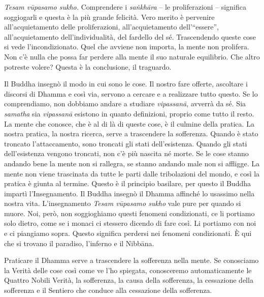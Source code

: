 \emph{Tesam vūpasamo sukho.} Comprendere i \emph{saṅkhāra} -- le
proliferazioni -- significa soggiogarli e questa è la più grande
felicità. Vero merito è pervenire all'acquietamento delle
proliferazioni, all'acquietamento dell'``essere'', all'acquietamento
dell'individualità, del fardello del sé. Trascendendo queste cose si
vede l'incondizionato. Quel che avviene non importa, la mente non
prolifera. Non c'è nulla che possa far perdere alla mente il suo
naturale equilibrio. Che altro potreste volere? Questa è la conclusione,
il traguardo.

Il Buddha insegnò il modo in cui sono le cose. Il nostro fare offerte,
ascoltare i discorsi di Dhamma e così via, servono a cercare e a
realizzare tutto questo. Se lo comprendiamo, non dobbiamo andare a
studiare \emph{vipassanā}, avverrà da sé. Sia \emph{samatha} sia
\emph{vipassanā} esistono in quanto definizioni, proprio come tutto il
resto. La mente che conosce, che è al di là di queste cose, è il culmine
della pratica. La nostra pratica, la nostra ricerca, serve a trascendere
la sofferenza. Quando è stato troncato l'attaccamento, sono troncati gli
stati dell'esistenza. Quando gli stati dell'esistenza vengono troncati,
non c'è più nascita né morte. Se le cose stanno andando bene la mente
non si rallegra, se stanno andando male non si affligge. La mente non
viene trascinata da tutte le parti dalle tribolazioni del mondo, e così
la pratica è giunta al termine. Questo è il principio basilare, per
questo il Buddha impartì l'Insegnamento. Il Buddha insegnò il Dhamma
affinché lo usassimo nella nostra vita. L'insegnamento \emph{Tesam
vūpasamo sukho} vale pure per quando si muore. Noi, però, non
soggioghiamo questi fenomeni condizionati, ce li portiamo solo dietro,
come se i monaci ci stessero dicendo di fare così. Li portiamo con noi e
ci piangiamo sopra. Questo significa perdersi nei fenomeni condizionati.
È qui che si trovano il paradiso, l'inferno e il Nibbāna.

Praticare il Dhamma serve a trascendere la sofferenza nella mente. Se
conosciamo la Verità delle cose così come ve l'ho spiegata, conosceremo
automaticamente le Quattro Nobili Verità, la sofferenza, la causa della
sofferenza, la cessazione della sofferenza e il Sentiero che conduce
alla cessazione della sofferenza.

